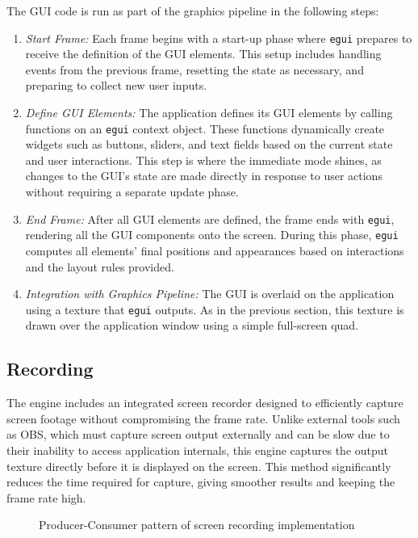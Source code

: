 The GUI code is run as part of the graphics pipeline in the following steps:
\begin{enumerate}
\item \emph{Start Frame:} Each frame begins with a start-up phase where \verb|egui| prepares to receive the definition of the GUI elements. This setup includes handling events from the previous frame, resetting the state as necessary, and preparing to collect new user inputs.

\item \emph{Define GUI Elements:} The application defines its GUI elements by calling functions on an \verb|egui| context object. These functions dynamically create widgets such as buttons, sliders, and text fields based on the current state and user interactions. This step is where the immediate mode shines, as changes to the GUI's state are made directly in response to user actions without requiring a separate update phase.

\item \emph{End Frame:} After all GUI elements are defined, the frame ends with \verb|egui|, rendering all the GUI components onto the screen. During this phase, \verb|egui| computes all elements' final positions and appearances based on interactions and the layout rules provided.

\item \emph{Integration with Graphics Pipeline:} The GUI is overlaid on the application using a texture that \verb|egui| outputs. As in the previous section, this texture is drawn over the application window using a simple full-screen quad.
\end{enumerate}

\subsection{Recording}

The engine includes an integrated screen recorder designed to efficiently capture screen footage without compromising the frame rate. Unlike external tools such as OBS, which must capture screen output externally and can be slow due to their inability to access application internals, this engine captures the output texture directly before it is displayed on the screen. This method significantly reduces the time required for capture, giving smoother results and keeping the frame rate high.

\begin{figure}[H]
  \centering
  
  \caption{Producer-Consumer pattern of screen recording implementation}
\end{figure}


